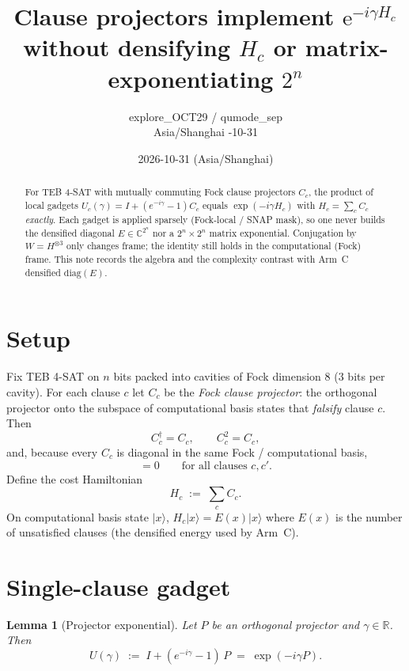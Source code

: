 \documentclass[11pt]{article}
\title{Clause projectors implement $\mathrm{e}^{-i\gamma H_c}$\\
without densifying $H_c$ or matrix-exponentiating $2^n$}
\author{explore\_OCT29 / qumode\_sep\\
Asia/Shanghai \quad 2026-10-31}
\date{2026-10-31 (Asia/Shanghai)}
\newtheorem{lemma}{Lemma}
\theoremstyle{definition}
\begin{document}
\maketitle

\begin{abstract}
For TEB 4-SAT with mutually commuting Fock clause projectors $C_c$,
the product of local gadgets
$U_c(\gamma)=I+(e^{-i\gamma}-1)C_c$ equals $\exp(-i\gamma H_c)$ with
$H_c=\sum_c C_c$ \emph{exactly}.  Each gadget is applied sparsely
(Fock-local / SNAP mask), so one never builds the densified diagonal
$E\in\mathbb{C}^{2^n}$ nor a $2^n\times 2^n$ matrix exponential.
Conjugation by $W=H^{\otimes 3}$ only changes frame; the identity
still holds in the computational (Fock) frame.  This note records the
algebra and the complexity contrast with Arm~C densified $\mathrm{diag}(E)$.
\end{abstract}

\section{Setup}

Fix TEB 4-SAT on $n$ bits packed into cavities of Fock dimension $8$
($3$ bits per cavity).  For each clause $c$ let $C_c$ be the
\emph{Fock clause projector}: the orthogonal projector onto the
subspace of computational basis states that \emph{falsify} clause $c$.
Then
\begin{equation}
  C_c^\dagger = C_c,\qquad C_c^2 = C_c,
\end{equation}
and, because every $C_c$ is diagonal in the same Fock / computational
basis,
\begin{equation}
  [C_c,C_{c'}]=0\qquad\text{for all clauses }c,c'.
\end{equation}
Define the cost Hamiltonian
\begin{equation}
  H_c \;:=\; \sum_{c} C_c.
\end{equation}
On computational basis state $\lvert x\rangle$,
$H_c\lvert x\rangle = E(x)\lvert x\rangle$ where $E(x)$ is the number
of unsatisfied clauses (the densified energy used by Arm~C).

\section{Single-clause gadget}

\begin{lemma}[Projector exponential]
\label{lem:single}
Let $P$ be an orthogonal projector and $\gamma\in\mathbb{R}$.  Then
\begin{equation}
  U(\gamma) \;:=\; I + (e^{-i\gamma}-1)\,P
  \;=\;
  \exp(-i\gamma P).
\end{equation}
\end{lemma}
\end{document}

